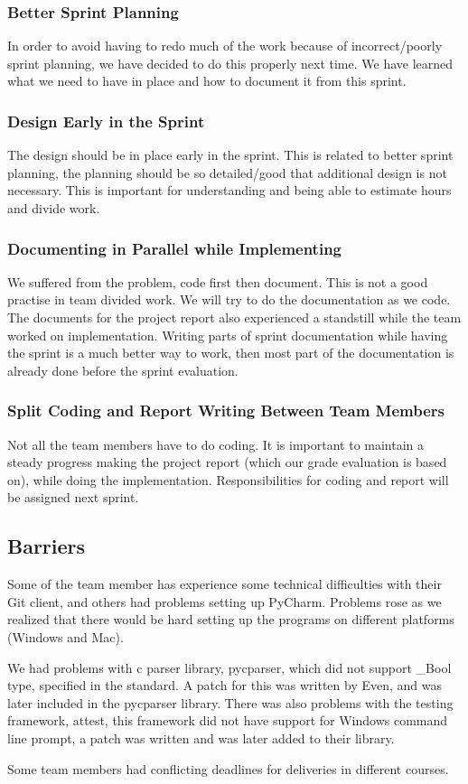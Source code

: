 \subsubsection{Better Sprint Planning}
In order to avoid having to redo much of the work because of incorrect/poorly
sprint planning, we have decided to do this properly next time. We have learned
what we need to have in place and how to document it from this sprint.

\subsubsection{Design Early in the Sprint} 
The design should be in place early in the sprint. This is related to better
sprint planning, the planning should be so detailed/good that additional design
is not necessary. This is important for understanding and being able to
estimate hours and divide work.

\subsubsection{Documenting in Parallel while Implementing}
We suffered from the problem, code first then document. This is not a good
practise in team divided work. We will try to do the documentation as we code.
The documents for the project report also experienced a standstill while the
team worked on implementation. Writing parts of sprint documentation while
having the sprint is a much better way to work, then most part of the
documentation is already done before the sprint evaluation.

\subsubsection{Split Coding and Report Writing Between Team Members} 
Not all the team members have to do coding. It is important to maintain a
steady progress making the project report (which our grade evaluation is based
on), while doing the implementation. Responsibilities for coding and report
will be assigned next sprint. 

\subsection{Barriers}
Some of the team member has experience some technical difficulties with their
Git client, and others had problems setting up PyCharm. Problems rose as we
realized that there would be hard setting up the programs on different
platforms (Windows and Mac).

We had problems with \Gls{c} \gls{parser} \gls{library}, \gls{pycparser}, which did not support \_Bool
type, specified in the  standard. A patch for this was written by Even, and
was later included in the \gls{pycparser} \gls{library}. There was also problems with the
testing framework, attest, this framework did not have support for Windows
command line prompt, a patch was written and was later added to their \gls{library}.

Some team members had conflicting deadlines for deliveries in different courses.

